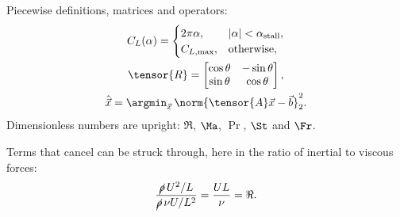 Piecewise definitions, matrices and operators:
\begin{gather}
    C_L(\alpha) =
    \begin{cases}
        2\pi\alpha,             & |\alpha| < \alpha_\text{stall}, \\
        C_{L,\text{max}},       & \text{otherwise},
    \end{cases} \\
    \tensor{R} =
    \begin{bmatrix}
        \cos\theta & -\sin\theta \\
        \sin\theta & \cos\theta
    \end{bmatrix}, \\
    \hat{\vec{x}} = \argmin_{\vec{x}} \, \norm{\tensor{A} \vec{x} - \vec{b}}_2^2 .
\end{gather}
Dimensionless numbers are upright: $\Re$, $\Ma$, $\Pr$, $\St$ and $\Fr$.

Terms that cancel can be struck through, here in the ratio of inertial to viscous forces:
\begin{equation*}
    \frac{\cancel{\rho} \, U^2 / L}{\cancel{\rho} \, \nu U / L^2} = \frac{U L}{\nu} = \Re .
\end{equation*}

